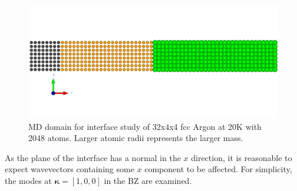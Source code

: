 \documentclass[aps,prb,preprint,preprintnumbers,amsmath,amssymb,floatfix,superscriptaddress]{revtex4}
\begin{document}
\begin{figure}[ht]
\centering
\includegraphics[scale=0.25]{supcell}
\caption{MD domain for interface study of 32x4x4 fcc Argon at 20K with 2048 atoms. Larger atomic radii represents the larger mass.}
\label{fig:subfig1}
\end{figure}
As the plane of the interface has a normal in the $x$ direction, it is reasonable to expect wavevectors containing some $x$ component to be affected. For simplicity, the modes at $\pmb{\kappa}=[1,0,0]$ in the BZ are examined. 
\end{document}
